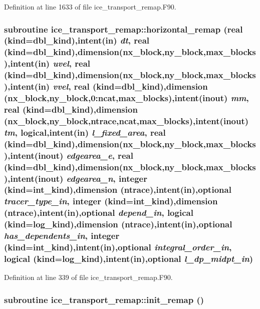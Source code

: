 Definition at line 1633 of file ice\_\-transport\_\-remap.F90.\hypertarget{namespaceice__transport__remap_af549caf7a8f27fcbe1cc3d9f8df4bacd}{
\subsubsection[{horizontal\_\-remap}]{\setlength{\rightskip}{0pt plus 5cm}subroutine ice\_\-transport\_\-remap::horizontal\_\-remap (real (kind=dbl\_\-kind),intent(in) {\em dt}, \/  real (kind=dbl\_\-kind),dimension(nx\_\-block,ny\_\-block,max\_\-blocks),intent(in) {\em uvel}, \/  real (kind=dbl\_\-kind),dimension(nx\_\-block,ny\_\-block,max\_\-blocks),intent(in) {\em vvel}, \/  real (kind=dbl\_\-kind),dimension (nx\_\-block,ny\_\-block,0:ncat,max\_\-blocks),intent(inout) {\em mm}, \/  real (kind=dbl\_\-kind),dimension (nx\_\-block,ny\_\-block,ntrace,ncat,max\_\-blocks),intent(inout) {\em tm}, \/  logical,intent(in) {\em l\_\-fixed\_\-area}, \/  real (kind=dbl\_\-kind),dimension(nx\_\-block,ny\_\-block,max\_\-blocks),intent(inout) {\em edgearea\_\-e}, \/  real (kind=dbl\_\-kind),dimension(nx\_\-block,ny\_\-block,max\_\-blocks),intent(inout) {\em edgearea\_\-n}, \/  integer (kind=int\_\-kind),dimension (ntrace),intent(in),optional {\em tracer\_\-type\_\-in}, \/  integer (kind=int\_\-kind),dimension (ntrace),intent(in),optional {\em depend\_\-in}, \/  logical (kind=log\_\-kind),dimension (ntrace),intent(in),optional {\em has\_\-dependents\_\-in}, \/  integer (kind=int\_\-kind),intent(in),optional {\em integral\_\-order\_\-in}, \/  logical (kind=log\_\-kind),intent(in),optional {\em l\_\-dp\_\-midpt\_\-in})}}
\label{namespaceice__transport__remap_af549caf7a8f27fcbe1cc3d9f8df4bacd}


Definition at line 339 of file ice\_\-transport\_\-remap.F90.\hypertarget{namespaceice__transport__remap_ae1b446db8b6220961bfcacd0c9b57fd4}{
\subsubsection[{init\_\-remap}]{\setlength{\rightskip}{0pt plus 5cm}subroutine ice\_\-transport\_\-remap::init\_\-remap ()}}
\label{namespaceice__transport__remap_ae1b446db8b6220961bfcacd0c9b57fd4}



